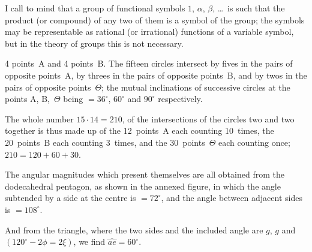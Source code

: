 \documentclass[11pt,a4paper]{book}
\begin{document}
\begin{art}
I call to mind that a group of functional symbols $1$, $\alpha$, $\beta$, \ldots\ is such
that the product (or compound) of any two of them is a symbol of the
group; the symbols may be representable as rational (or irrational)
functions of a variable symbol, but in the theory of groups this is not
necessary.
\end{art}


\begin{art}
4 points~A and 4 points~B. The fifteen circles intersect by fives in the
pairs of opposite points~A, by threes in the pairs of opposite points~B,
and by twos in the pairs of opposite points~$\Theta$; the mutual inclinations
of successive circles at the points A, B,~$\Theta$ being $=36^\circ$, $60^\circ$ and
$90^\circ$ respectively.

The whole number $15 \cdot 14 = 210$, of the intersections of the circles
two and two together is thus made up of the 12~points~A each counting
10~times, the 20~points~B each counting 3~times, and the 30~points~$\Theta$
each counting once; $210 = 120 + 60 + 30$.
\end{art}

\begin{art}
The angular magnitudes which present themselves are all obtained from
the dodecahedral pentagon, as shown in the annexed figure, in which the
angle subtended by a side at the centre is $= 72^\circ$, and the angle between
adjacent sides is $= 108^\circ$.
\end{art}

\begin{art}
And from the triangle, where the two sides and the included angle are
$g$, $g$ and $(120^\circ - 2\phi = 2\xi)$, we find $\widehat{ae} = 60^\circ$.
\end{art}
\end{document}
